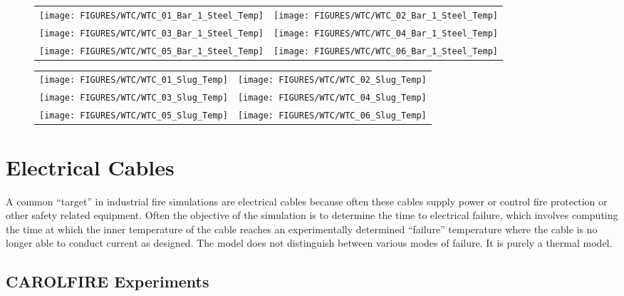 \begin{figure}[p]
\begin{tabular*}{\textwidth}{l@{\extracolsep{\fill}}r}
\texttt{[image: FIGURES/WTC/WTC\_01\_Bar\_1\_Steel\_Temp]} &
\texttt{[image: FIGURES/WTC/WTC\_02\_Bar\_1\_Steel\_Temp]} \\
\texttt{[image: FIGURES/WTC/WTC\_03\_Bar\_1\_Steel\_Temp]} &
\texttt{[image: FIGURES/WTC/WTC\_04\_Bar\_1\_Steel\_Temp]} \\
\texttt{[image: FIGURES/WTC/WTC\_05\_Bar\_1\_Steel\_Temp]} &
\texttt{[image: FIGURES/WTC/WTC\_06\_Bar\_1\_Steel\_Temp]}
\end{tabular*}
\label{NIST_WTC_Bar_1_Steel_Temp}
\end{figure}


\begin{figure}[p]
\begin{tabular*}{\textwidth}{l@{\extracolsep{\fill}}r}
\texttt{[image: FIGURES/WTC/WTC\_01\_Slug\_Temp]} &
\texttt{[image: FIGURES/WTC/WTC\_02\_Slug\_Temp]} \\
\texttt{[image: FIGURES/WTC/WTC\_03\_Slug\_Temp]} &
\texttt{[image: FIGURES/WTC/WTC\_04\_Slug\_Temp]} \\
\texttt{[image: FIGURES/WTC/WTC\_05\_Slug\_Temp]} &
\texttt{[image: FIGURES/WTC/WTC\_06\_Slug\_Temp]}
\end{tabular*}
\label{NIST_WTC_Slug_Temp}
\end{figure}

\clearpage





\section{Electrical Cables}

A common ``target'' in industrial fire simulations are electrical cables because often these cables supply power or control fire protection or other safety related equipment. Often the objective of the simulation is to determine the time to electrical failure, which involves computing the time at which the inner temperature of the cable reaches an experimentally determined ``failure'' temperature where the cable is no longer able to conduct current as designed. The model does not distinguish between various modes of failure. It is purely a thermal model.


\subsection{CAROLFIRE Experiments}

